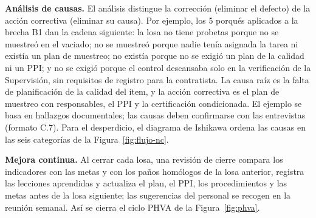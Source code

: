 \begin{figure}[H]
\end{figure}

\textbf{Análisis de causas.} El análisis distingue la corrección (eliminar el defecto) de la acción correctiva (eliminar su causa). Por ejemplo, los 5 porqués aplicados a la brecha B1 dan la cadena siguiente: la losa no tiene probetas porque no se muestreó en el vaciado; no se muestreó porque nadie tenía asignada la tarea ni existía un plan de muestreo; no existía porque no se exigió un plan de la calidad ni un PPI; y no se exigió porque el control descansaba solo en la verificación de la Supervisión, sin requisitos de registro para la contratista. La causa raíz es la falta de planificación de la calidad del ítem, y la acción correctiva es el plan de muestreo con responsables, el PPI y la certificación condicionada. El ejemplo se basa en hallazgos documentales; las causas deben confirmarse con las entrevistas (formato C.7). Para el desperdicio, el diagrama de Ishikawa ordena las causas en las seis categorías de la Figura~\ref{fig:flujo-nc}.

\textbf{Mejora continua.} Al cerrar cada losa, una revisión de cierre compara los indicadores con las metas y con los paños homólogos de la losa anterior, registra las lecciones aprendidas y actualiza el plan, el PPI, los procedimientos y las metas antes de la losa siguiente; las sugerencias del personal se recogen en la reunión semanal. Así se cierra el ciclo PHVA de la Figura~\ref{fig:phva}.

